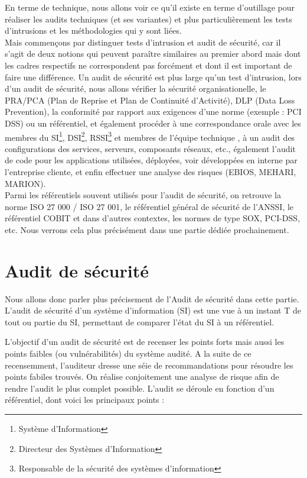 \documentclass[a4paper]{memoir}
\begin{document}
En terme de technique, nous allons voir ce qu'il existe en terme d'outillage pour réaliser les audits techniques (et ses variantes) et plus particulièrement les tests d'intrusions et les méthodologies qui y sont liées.\\
Mais commençons par distinguer tests d'intrusion et audit de sécurité, car il s'agit de deux notions qui peuvent paraître similaires au premier abord mais dont les cadres respectifs ne correspondent pas forcément et dont il est important de faire une différence. 
Un audit de sécurité est plus large qu'un test d'intrusion, lors d'un audit de sécurité, nous allons vérifier la sécurité organisationelle, le PRA/PCA (Plan de Reprise et Plan de Continuité d'Activité), DLP (Data Loss Prevention), la conformité par rapport aux exigences d'une norme (exemple : PCI DSS) ou un référentiel, et également procéder à une correspondance orale avec les membres du SI\footnote{Système d'Information}, DSI\footnote{Directeur des Systèmes d'Information}, RSSI\footnote{Responsable de la sécurité des systèmes d'information} et membres de l’équipe technique , à un audit des configurations des services, serveurs, composants réseaux, etc., également l’audit de code pour les applications utilisées, déployées, voir développées en interne par l’entreprise cliente, et enfin effectuer une analyse des risques (EBIOS, MEHARI, MARION).\\ 

Parmi les référentiels souvent utilisés pour l’audit de sécurité, on retrouve la norme ISO 27 000 / ISO 27 001, le référentiel général de sécurité de l’ANSSI, le référentiel COBIT et dans d’autres contextes, les normes de type SOX, PCI-DSS, etc. Nous verrons cela plus précisément dans une partie dédiée prochainement.

\chapter{Audit de sécurité}

Nous allons donc parler plus précisement de l'Audit de sécurité dans cette partie. L'audit de sécurité d'un système d'information (SI) est une vue à un instant T de tout ou partie du SI, permettant de comparer l'état du SI à un référentiel.

L'objectif d'un audit de sécurité est de recenser les points forts mais aussi les points faibles (ou vulnérabilités) du système audité. A la suite de ce recensemment, l'auditeur dresse une séie de recommandations pour résoudre les points fabiles trouvés. On réalise conjoitement une analyse de risque afin de rendre l'audit le plus complet possible.
L'audit se déroule en fonction d'un référentiel, dont voici les principaux points :
\end{document}
